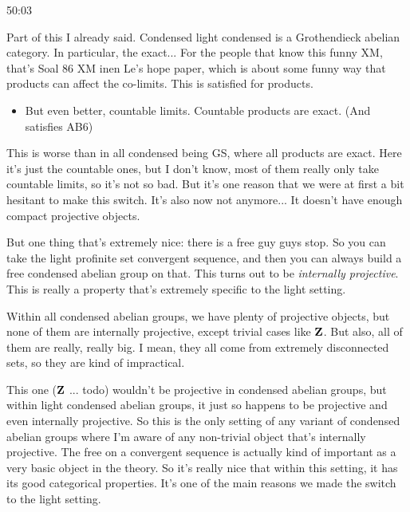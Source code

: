 \begin{unfinished}{50:03}
\begin{remark}
\begin{example}
\end{example}

Part of this I already said. Condensed light condensed is a Grothendieck abelian category. In particular, the  exact... For the people that know this funny XM, that's Soal 86 XM inen Le's hope paper, which is about some funny way that products can affect the co-limits. This is satisfied for products.

\begin{itemize}
\item But even better, countable limits. Countable products are exact. (And satisfies AB6)

\end{itemize}

This is worse than in all condensed being GS, where all products are exact. Here it's just the countable ones, but I don't know, most of them really only take countable limits, so it's not so bad. But it's one reason that we were at first a bit hesitant to make this switch. It's also now not anymore... It doesn't have enough compact projective objects.

But one thing that's extremely nice: there is a free guy guys stop. So you can take the light profinite set convergent sequence, and then you can always build a free condensed abelian group on that. This turns out to be \emph{internally projective}. This is really a property that's extremely specific to the light setting.

Within all condensed abelian groups, we have plenty of projective objects, but none of them are internally projective, except trivial cases like $\mathbf Z$. But also, all of them are really, really big. I mean, they all come from extremely disconnected sets, so they are kind of impractical.

This one ($\mathbf Z$ ... todo) wouldn't be projective in condensed abelian groups, but within light condensed abelian groups, it just so happens to be projective and even internally projective. So this is the only setting of any variant of condensed abelian groups where I'm aware of any non-trivial object that's internally projective. The free  on a convergent sequence is actually kind of important as a very basic object in the theory. So it's really nice that within this setting, it has its good categorical properties. It's one of the main reasons we made the switch to the light setting.


\end{remark}
\end{unfinished}
